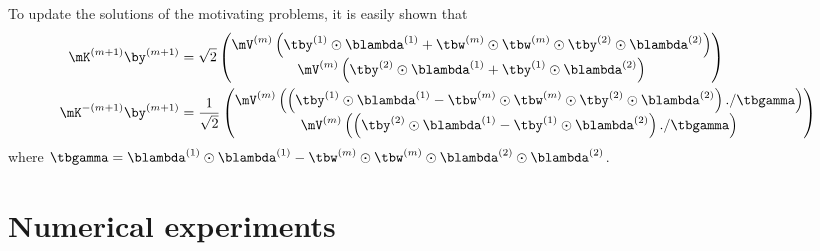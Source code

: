 \documentclass[acmsmall]{acmart}
\begin{document}
To update the solutions of the motivating problems, it is easily shown that  
\begin{align*}
    \mK^{(m+1)} \by^{(m+1)} 
    &= \sqrt{2} \begin{pmatrix} \mV^{(m)} \left(\tby^{(1)} \odot \blambda^{(1)} + \tbw^{(m)} \odot \tbw^{(m)} \odot \tby^{(2)} \odot \blambda^{(2)} \right) \\ \mV^{(m)} \left(\tby^{(2)} \odot \blambda^{(1)} + \tby^{(1)} \odot \blambda^{(2)} \right)\end{pmatrix} \\
    \mK^{-(m+1)} \by^{(m+1)} 
    &= \frac{1}{\sqrt{2}} \begin{pmatrix} \mV^{(m)} \left(\left(\tby^{(1)} \odot \blambda^{(1)} - \tbw^{(m)} \odot \tbw^{(m)} \odot \tby^{(2)} \odot \blambda^{(2)} \right) ./ \tbgamma\right) \\ \mV^{(m)}\left( \left( \tby^{(2)} \odot \blambda^{(1)} - \tby^{(1)} \odot \blambda^{(2)} \right) ./ \tbgamma \right)\end{pmatrix}
\end{align*}
where $\tbgamma = \blambda^{(1)} \odot \blambda^{(1)} - \tbw^{(m)} \odot \tbw^{(m)} \odot \blambda^{(2)} \odot \blambda^{(2)}$. 


\section{Numerical experiments} \label{sec:numerical_experiments}
\end{document}
